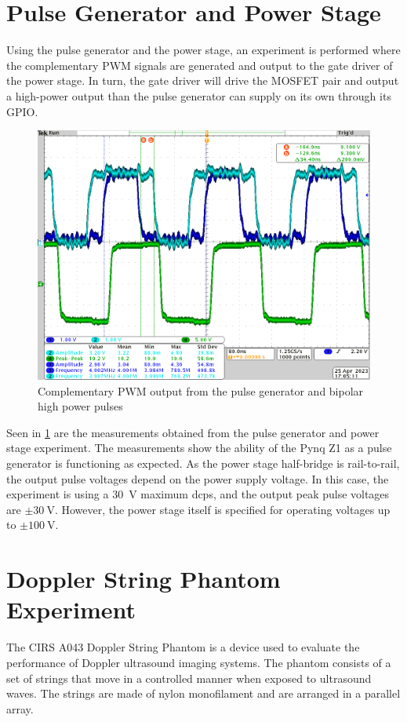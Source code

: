 \section{Pulse Generator and Power Stage}
Using the pulse generator and the power stage, an experiment is performed where the complementary PWM signals are generated and output to the gate driver of the power stage. In turn, the gate driver will drive the MOSFET pair and output a high-power output than the pulse generator can supply on its own through its GPIO.

\begin{figure}[htbp]
	\centering
	\includegraphics[width=.8\textwidth]{Figures/5_controlsystem_fpga_pwm.png}
	\caption{Complementary PWM output from the pulse generator and bipolar high power pulses}
	\label{fig:5_pulse_generator_experiment}
\end{figure}

Seen in \cref{fig:5_pulse_generator_experiment} are the measurements obtained from the pulse generator and power stage experiment. The measurements show the ability of the Pynq Z1 as a pulse generator is functioning as expected. As the power stage half-bridge is rail-to-rail, the output pulse voltages depend on the power supply voltage. In this case, the experiment is using a \qty{30}{\volt} maximum \gls{dcps}, and the output peak pulse voltages are $\pm \qty{30}{\volt}$. However, the power stage itself is specified for operating voltages up to $\pm \qty{100}{\volt}$.

\section{Doppler String Phantom Experiment}
The CIRS A043 Doppler String Phantom is a device used to evaluate the performance of Doppler ultrasound imaging systems. The phantom consists of a set of strings that move in a controlled manner when exposed to ultrasound waves. The strings are made of nylon monofilament and are arranged in a parallel array.

